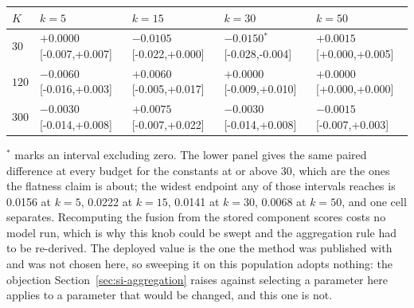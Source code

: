 \begin{table}[h]
\begin{threeparttable}
\vspace{4pt}
\scriptsize
\begin{tabular}{lllll}
\toprule
$K$ & $k=5$ & $k=15$ & $k=30$ & $k=50$ \\
\midrule
$30$ & $+0.0000$\phantom{$^{*}$} {\tiny [-0.007,+0.007]} & $-0.0105$\phantom{$^{*}$} {\tiny [-0.022,+0.000]} & $-0.0150$$^{*}$ {\tiny [-0.028,-0.004]} & $+0.0015$\phantom{$^{*}$} {\tiny [+0.000,+0.005]} \\
$120$ & $-0.0060$\phantom{$^{*}$} {\tiny [-0.016,+0.003]} & $+0.0060$\phantom{$^{*}$} {\tiny [-0.005,+0.017]} & $+0.0000$\phantom{$^{*}$} {\tiny [-0.009,+0.010]} & $+0.0000$\phantom{$^{*}$} {\tiny [+0.000,+0.000]} \\
$300$ & $-0.0030$\phantom{$^{*}$} {\tiny [-0.014,+0.008]} & $+0.0075$\phantom{$^{*}$} {\tiny [-0.007,+0.022]} & $-0.0030$\phantom{$^{*}$} {\tiny [-0.014,+0.008]} & $-0.0015$\phantom{$^{*}$} {\tiny [-0.007,+0.003]} \\
\bottomrule
\end{tabular}
\normalsize
\begin{tablenotes}[flushleft]\footnotesize
\item $^{*}$ marks an interval excluding zero. The lower panel gives the same paired difference at every budget for the constants at or above 30, which are the ones the flatness claim is about; the widest endpoint any of those intervals reaches is 0.0156 at $k=5$, 0.0222 at $k=15$, 0.0141 at $k=30$, 0.0068 at $k=50$, and one cell separates. Recomputing the fusion from the stored component scores costs no model run, which is why this knob could be swept and the aggregation rule had to be re-derived. The deployed value is the one the method was published with and was not chosen here, so sweeping it on this population adopts nothing: the objection Section~\ref{sec:si-aggregation} raises against selecting a parameter here applies to a parameter that would be changed, and this one is not.
\end{tablenotes}
\end{threeparttable}
\end{table}

